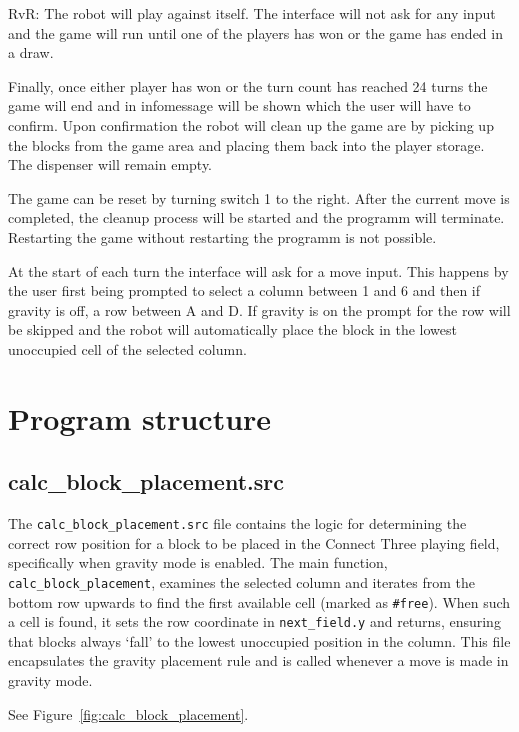 \documentclass{article}
\begin{document}
        RvR\@: The robot will play against itself. The interface will not ask for any input and the game will run until one of the players has won or the game has ended in a draw.

        Finally, once either player has won or the turn count has reached 24 turns the game will end and in infomessage will be shown which the user will have to confirm. Upon confirmation the robot will clean up the game are by picking up the blocks from the game area and placing them back into the player storage. The dispenser will remain empty.

        The game can be reset by turning switch 1 to the right. After the current move is completed, the cleanup process will be started and the programm will terminate. Restarting the game without restarting the programm is not possible.

        At the start of each turn the interface will ask for a move input. This happens by the user first being prompted to select a column between 1 and 6 and then if gravity is off, a row between A and D. If gravity is on the prompt for the row will be skipped and the robot will automatically place the block in the lowest unoccupied cell of the selected column.
        \newpage

    \section{Program structure}
        \subsection{calc\_block\_placement.src}
            The \texttt{calc\_block\_placement.src} file contains the logic for determining the correct row position for a block to be placed in the Connect Three playing field, specifically when gravity mode is enabled. The main function, \texttt{calc\_block\_placement}, examines the selected column and iterates from the bottom row upwards to find the first available cell (marked as \texttt{\#free}). When such a cell is found, it sets the row coordinate in \texttt{next\_field.y} and returns, ensuring that blocks always `fall' to the lowest unoccupied position in the column. This file encapsulates the gravity placement rule and is called whenever a move is made in gravity mode.

            See Figure~\ref{fig:calc_block_placement}.
\end{document}
